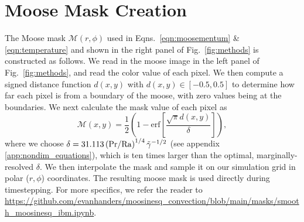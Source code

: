 \section{Moose Mask Creation}
\label{app:mask}

The Moose mask $\mathcal{M}(r,\phi)$ used in Eqns.~\ref{eqn:moosementum} \& \ref{eqn:temperature} and shown in the right panel of Fig.~\ref{fig:methods} is constructed as follows.
We read in the moose image in the left panel of Fig.~\ref{fig:methods}, and read the color value of each pixel.
We then compute a signed distance function $d(x,y)$ with $d(x,y) \in [-0.5, 0.5]$ to determine how far each pixel is from a boundary of the moose, with zero values being at the boundaries.
We next calculate the mask value of each pixel as
\begin{equation}
\mathcal{M}(x,y) = \frac{1}{2}\left(1-\mathrm{erf}\left[\frac{\sqrt{\pi} d(x,y)}{\delta}\right]\right),
\end{equation}
where we choose $\delta = 31.113 \left(\rm{Pr}/\rm{Ra}\right)^{1/4} \tilde{\gamma}^{-1/2}$ (see appendix \ref{app:nondim_equations}), which is ten times larger than the optimal, marginally-resolved $\delta$.
We then interpolate the mask and sample it on our simulation grid in polar ($r, \phi$) coordinates.
The resulting moose mask is used directly during timestepping.
For more specifics, we refer the reader to \url{https://github.com/evanhanders/moosinesq_convection/blob/main/masks/smooth_moosinesq_ibm.ipynb}.
